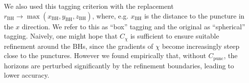 We also used this tagging criterion with the replacement
$r_{\mathrm{BH}}\to
\max(x_{\mathrm{BH}},y_{\mathrm{BH}},z_{\mathrm{BH}})$, where,
e.g. $x_{\mathrm{BH}}$ is the distance to the puncture in the $x$
direction. We refer to this as ``box'' tagging and the original as
``spherical'' tagging. Naively, one might hope that $C_{\chi}$ is
sufficient to ensure suitable refinement around the BHs, since the
gradients of $\chi$ become increasingly steep close to the
punctures. However we found empirically that, without
$C_{\text{punc}}$, the horizons are perturbed significantly by the
refinement boundaries, leading to lower accuracy.

